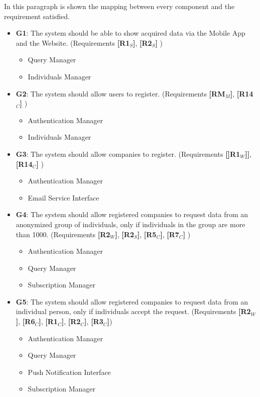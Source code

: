 In this paragraph is shown the mapping between every component and the requirement satisfied.


\begin{itemize}
    \item \textbf{G1}: The system should be able to show acquired data via the Mobile App and the Website. \newline (Requirements \textbf{[R1$_S$]}, \textbf{[R2$_S$]} )
    \begin{itemize}
        \item Query Manager
        \item Individuals Manager
    \end{itemize}
        

    \item \textbf{G2}: The system should allow users to register. \newline (Requirements \textbf{[RM$_M$]}, \textbf{[R14$_C$]} )
      \begin{itemize}
        \item Authentication Manager
        \item Individuals Manager
    \end{itemize}

    \item \textbf{G3}: The system should allow companies to register. \newline(Requirements \textbf{[]R1$_W$]]}, \textbf{[R14$_C$]} )
    \begin{itemize}
        \item Authentication Manager
        \item Email Service Interface
    \end{itemize}
   
    \item \textbf{G4}: The system should allow registered companies to request data from an anonymized group of individuals, only if individuals in the group are more than 1000. \newline(Requirements \textbf{[R2$_W$]}, \textbf{[R2$_S$]}, \textbf{[R5$_C$]}, \textbf{[R7$_C$]} )
    \begin{itemize}
        \item Authentication Manager
        \item Query Manager
        \item Subscription Manager
    \end{itemize}    
   
  
    \item \textbf{G5}: The system should allow registered companies to request data from an individual person, only if individuals accept the request. \newline(Requirements \textbf{[R2$_W$]}, \textbf{[R6$_C$]}, \textbf{[R1$_C$]}, \textbf{[R2$_C$]}, \textbf{[R3$_C$]})
    \begin{itemize}
        \item Authentication Manager
        \item Query Manager
        \item Push Notification Interface
        \item Subscription Manager
    \end{itemize}  
    

\end{itemize}
